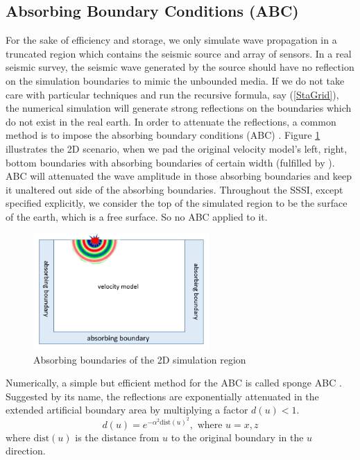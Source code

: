 \documentclass[11pt]{article}
\theoremstyle{plain}
\theoremstyle{definition}
\theoremstyle{remark}
\numberwithin{equation}{section}
\begin{document}
\subsection{Absorbing Boundary Conditions (ABC)}
For the sake of efficiency and storage, we only simulate wave propagation in a truncated region which contains the seismic source and array of sensors. In a real seismic survey, the seismic wave generated by the source should have no reflection on the simulation boundaries to mimic the unbounded media. If we do not take care with particular techniques and run the recursive formula, say (\ref{StaGrid}), the numerical simulation will generate strong reflections on the boundaries which do not exist in the real earth. In order to attenuate the reflections, a common method is to impose the absorbing boundary conditions (ABC) \cite{EngMaj1977, ClaEng1977}. Figure \ref{fig:ABC} illustrates the 2D scenario, when we pad the original velocity model's left, right, bottom boundaries with absorbing boundaries of certain width (fulfilled by ). ABC will attenuated the wave amplitude in those absorbing boundaries and keep it unaltered out side of the absorbing boundaries. Throughout the SSSI, except specified explicitly, we consider the top of the simulated region to be the surface of the earth, which is a free surface. So no ABC applied to it.

\begin{figure}
\centering
\includegraphics[width=0.6\textwidth]{Fig/abc.png}
\caption{Absorbing boundaries of the 2D simulation region}
\label{fig:ABC}
\end{figure}

Numerically, a simple but efficient method for the ABC is called sponge ABC \cite{CerKosAO1985}. Suggested by its name, the reflections are exponentially attenuated in the extended artificial boundary area by multiplying a factor $d(u) < 1$.
\begin{equation}
  d(u) = e^{-\alpha^2\text{dist}(u)^2}, \mbox{  where  } u=x, z
\end{equation}
where $\text{dist}(u)$ is the distance from $u$ to the original boundary in the $u$ direction. 
\end{document}
